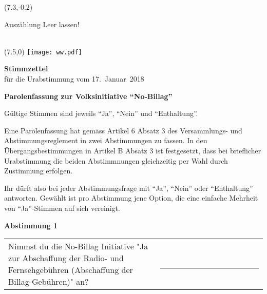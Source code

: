 \documentclass[11pt, a4paper]{scrartcl}
\begin{document}
{\begin{minipage}[t][12.5cm][t]{\textwidth}
\begin{textblock}{6}(7.3,-0.2)
\begin{framed}
Auszählung \hfill Leer lassen! \\
\vspace{1.5cm} ~ \\
\end{framed}
\end{textblock}


\end{minipage}

\newpage

\begin{minipage}[t][12.5cm][t]{17.5cm}

\begin{textblock}{6}(7.5,0)
\texttt{[image: ww.pdf]}
\end{textblock}

{\LARGE\textbf{Stimmzettel}} \\
für die Urabstimmung vom 17.~Januar~2018 \\

\vspace{2cm}

\textbf{Parolenfassung zur Volksinitiative \enquote{No-Billag}}

\vspace{0.1cm}
Gültige Stimmen sind jeweils \enquote{Ja}, \enquote{Nein} und \enquote{Enthaltung}.

\vspace{0.1cm}
Eine Parolenfassung hat gemäss Artikel 6 Absatz 3 des Versammlungs- und Abstimmungsreglement in zwei Abstimmungen zu fassen. In den Übergangsbestimmungen in Artikel B Absatz 3 ist festgesetzt, dass bei brieflicher Urabstimmung die beiden Abstimmnungen gleichzeitig per Wahl durch Zustimmung erfolgen.

\vspace{0.1cm}
Ihr dürft also bei jeder Abstimmungsfrage mit \enquote{Ja}, \enquote{Nein} oder \enquote{Enthaltung} antworten. Gewählt ist pro Abstimmung jene Option, die eine einfache Mehrheit von \enquote{Ja}-Stimmen auf sich vereinigt. 

\vspace{1cm}

\textbf{Abstimmung 1}

\vspace{0.5cm}

\begin{tabular}{ b{13.5cm} b{3cm} }
Nimmst du die No-Billag Initiative "Ja zur Abschaffung der Radio- und Fernsehgebühren (Abschaffung der Billag-Gebühren)" an?
& \_\_\_\_\_\_\_\_\_\_\_\_\_\_\_\_ \\
\end{tabular}


\end{minipage}}
\end{document}
